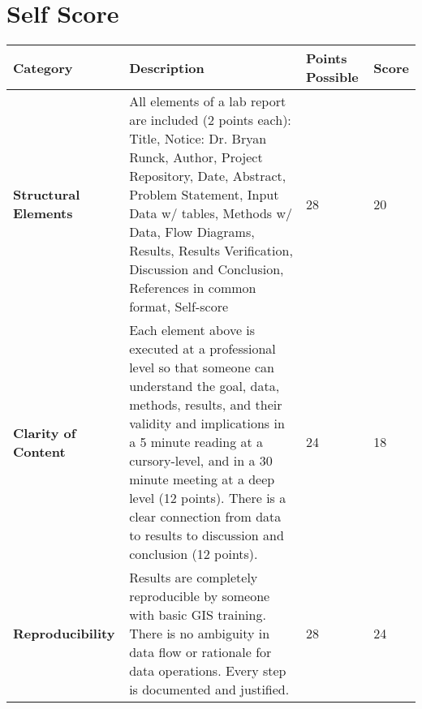 \documentclass[article,12pt]{article}
\numberwithin{equation}{section}
\begin{document}
\section*{Self Score}
\begin{tabular}{|p{.2\linewidth}|p{.2\linewidth}|p{.2\linewidth}|p{.1\linewidth}|}
	\hline
	\textbf{Category}            & \textbf{Description}                                                                                                                                                                                                                                                                                                                                              & \textbf{Points Possible} & \textbf{Score} \\ \hline
\vspace{.2in}\textbf{Structural Elements} & {\tiny All elements of a lab report are included (2 points each): Title, Notice: Dr. Bryan Runck, Author, Project Repository, Date, Abstract, Problem Statement, Input Data w/ tables, Methods w/ Data, Flow Diagrams, Results, Results Verification, Discussion and Conclusion, References in common format, Self-score}                                        & \vspace{.2in}28              &   \vspace{.2in}20    \\ \hline
	\vspace{.2in}\textbf{Clarity of Content}  & {\tiny Each element above is executed at a professional level so that someone can understand the goal, data, methods, results, and their validity and implications in a 5 minute reading at a cursory-level, and in a 30 minute meeting at a deep level (12 points). There is a clear connection from data to results to discussion and conclusion (12 points).} & \vspace{.2in}24              &  \vspace{.2in}18     \\ \hline
	\vspace{.2in}\textbf{Reproducibility}     & {\tiny Results are completely reproducible by someone with basic GIS training. There is no ambiguity in data flow or rationale for data operations. Every step is documented and justified.}                                                                                                                                                                     & \vspace{.2in}28              &     \vspace{.2in}24  \\ \hline

\end{tabular}
\end{document}
